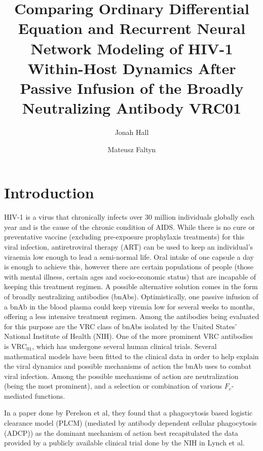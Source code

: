 \documentclass[fleqn,10pt]{wlscirep}
\title{Comparing Ordinary Differential Equation and Recurrent Neural Network Modeling of HIV-1 Within-Host Dynamics After Passive Infusion of the Broadly Neutralizing Antibody VRC01}
\author[1,*]{Jonah Hall}
\author[1,*]{Mateusz Faltyn}
\affil[1]{University of British Columbia, Department of Mathematics, Vancouver, V6T 1Z2, Canada}
\affil[*]{these authors contributed equally to this work}
\begin{document}
\flushbottom
\maketitle
%
%
\thispagestyle{empty}


\section*{Introduction}

HIV-1 is a virus that chronically infects over 30 million individuals globally each year and is the cause of the chronic condition of AIDS. While there is no cure or preventative vaccine (excluding pre-exposure prophylaxis treatments) for this viral infection, antiretroviral therapy (ART) can be used to keep an individual’s viraemia low enough to lead a semi-normal life. Oral intake of one capsule a day is enough to achieve this, however there are certain populations of people (those with mental illness, certain ages and socio-economic status) that are incapable of keeping this treatment regimen. A possible alternative solution comes in the form of broadly neutralizing antibodies (bnAbs). Optimistically, one passive infusion of a bnAb in the blood plasma could keep viremia low for several weeks to months, offering a less intensive treatment regimen. Among the antibodies being evaluated for this purpose are the VRC class of bnAbs isolated by the United States’ National Institute of Health (NIH). One of the more prominent VRC antibodies is VRC$_{01}$, which has undergone several human clinical trials. Several mathematical models have been fitted to the clinical data in order to help explain the viral dynamics and possible mechanisms of action the bnAb uses to combat viral infection. Among the possible mechanisms of action are neutralization (being the most prominent), and a selection or combination of various $F_c$-mediated functions.

In a paper done by Perelson et al,\cite{Cardozo:2021} they found that a phagocytosis based logistic clearance model (PLCM) (mediated by antibody dependent cellular phagocytosis (ADCP)) as the dominant mechanism of action best recapitulated the data provided by a publicly available clinical trial done by the NIH in Lynch et al.\cite{Lynch:2015}
\end{document}
